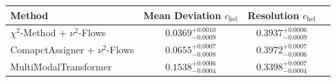    \begin{tabular}{lccc}
        \toprule
        Method & Mean Deviation $c_{\text{hel}}$ & Resolution $c_{\text{hel}}$ \\
        \midrule
        $\chi^2$-Method + $\nu^2$-Flows & $0.0369^{+0.0010}_{-0.0009}$ & $0.3937^{+0.0006}_{-0.0009}$ \\
        ComapctAssigner + $\nu^2$-Flows & $0.0655^{+0.0007}_{-0.0008}$ & $0.3972^{+0.0007}_{-0.0006}$ \\
        MultiModalTransformer & $0.1538^{+0.0006}_{-0.0004}$ & $0.3398^{+0.0007}_{-0.0004}$ \\
        \bottomrule
    \end{tabular}